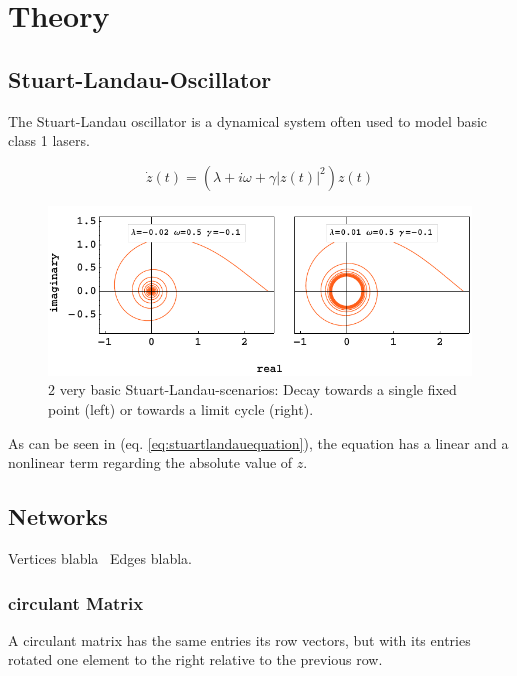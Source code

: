 \section{Theory}

	\subsection{Stuart-Landau-Oscillator}
	The Stuart-Landau oscillator is a dynamical system often used to model basic class 1 lasers.
	
	\begin{equation}	
		\dot{z}(t) = (\lambda +  i \omega + \gamma |z(t)|^2 ) z(t)
		\label{eq:stuartlandauequation}		
	\end{equation}

	\begin{figure}
		\centering
		\includegraphics[width=0.99\linewidth]{pics/stuart_landau_complex_Focus_LC}
		\caption{$2$ very basic Stuart-Landau-scenarios: Decay towards a single fixed point (left) or towards a limit cycle (right).}
		\label{fig:stuart_spiral}
	\end{figure}

As can be seen in (eq. \ref{eq:stuartlandauequation}), the equation has a linear and a nonlinear term regarding the absolute value of $z$.

\subsection{Networks}

Vertices blabla \
Edges blabla. \

	\subsubsection{circulant Matrix}
    A circulant matrix has the same entries its row vectors, but with its entries rotated one element to the right relative to the previous row.
    
